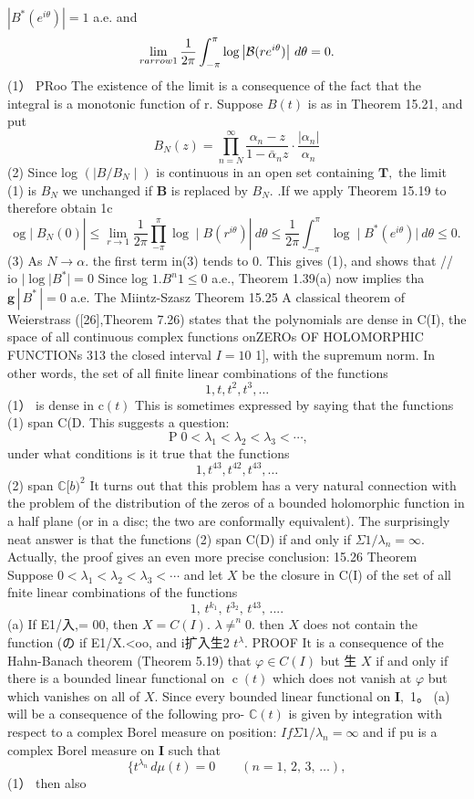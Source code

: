 $\left|B^{*}(e^{i\theta})\right|=1$ a.e. and $$ \operatorname*{lim}_{r arrow1}\frac{1}{2\pi}\int_{-\pi}^{\pi}\log\left|{\cal B}(r e^{i\theta})\right|\,d\theta=0. $$ (1） PRoo The existence of the limit is a consequence of the fact that the integral is a monotonic function of r. Suppose $\scriptstyle B(t)$ is as in Theorem 15.21, and put $$ B_{N}(z)=\prod_{n=N}^{\infty}{\frac{\alpha_{n}-z}{1-\bar{\alpha}_{n}z}}\cdot{\frac{|\alpha_{n}|}{\alpha_{n}}} $$ (2) Since log $(\mid B/B_{N}\mid)$ is continuous in an open set containing ${\boldsymbol{T}},$ the limit (1) is $B_{N}$ we unchanged if $\boldsymbol{B}$ is replaced by $B_{N}.$ .If we apply Theorem 15.19 to therefore obtain 1c $$ \mathrm{og}\mid B_{N}(0)|\leq\operatorname*{lim}_{r\to1}{\frac{1}{2\pi}}\prod_{-\pi}^{\pi}\log\mid B(r^{i\theta})|\ d\theta\leq{\frac{1}{2\pi}}\int_{-\pi}^{\pi}\log\mid B^{*}(e^{i\theta})|\ d\theta\leq0. $$ (3) As $N\to\alpha.$ the first term in(3) tends to 0. This gives (1), and shows that // io $|\log|B^{*}|=0$ Since log $1.B^{n}1\leq0$ a.e., Theorem 1.39(a) now implies tha $\mathbf{g}\,|\,B^{*}\,|=0$ a.e. The Miintz-Szasz Theorem 15.25 A classical theorem of Weierstrass ([26],Theorem 7.26) states that the polynomials are dense in C(I), the space of all continuous complex functions onZEROs OF HOLOMORPHIC FUNCTIONs 313 the closed interval $\scriptstyle I=10$ 1], with the supremum norm. In other words, the set of all finite linear combinations of the functions $$ 1,t,t^{2},t^{3},\ldots $$ (1） is dense in $\mathrm{c}(t)$ This is sometimes expressed by saying that the functions (1) span C(D. This suggests a question: $$ \operatorname{P}0<\lambda_{1}<\lambda_{2}<\lambda_{3}<\cdots, $$ under what conditions is it true that the functions $$ 1,t^{43},t^{42},t^{43},\ldots $$ (2) span $\mathbb{C}[b)^{2}$ It turns out that this problem has a very natural connection with the problem of the distribution of the zeros of a bounded holomorphic function in a half plane (or in a disc; the two are conformally equivalent). The surprisingly neat answer is that the functions (2) span C(D) if and only if $\Sigma1/\lambda_{n}=\infty.$ Actually, the proof gives an even more precise conclusion: 15.26 Theorem Suppose $0<\lambda_{1}<\lambda_{2}<\lambda_{3}<\cdots$ and let $X$ be the closure in C(I) of the set of all fnite linear combinations of the functions $$ 1,\,t^{k_{1}},\,t^{3_{2}},\,t^{43},\,.... $$ (a) If E1/入,= 00, then $X=C(I).$ $\scriptstyle\lambda\neq^{n}0.$ then $X$ does not contain the function (の if E1/X.<oo, and i扩入生{2} $t^{\lambda}.$ PROOF ${\mathrm{It}}$ is a consequence of the Hahn-Banach theorem (Theorem 5.19) that $\varphi\in C(I)$ but 生 $X$ if and only if there is a bounded linear functional on $\operatorname{c}(t)$ which does not vanish at $\varphi$ but which vanishes on all of $X.$ Since every bounded linear functional on ${\boldsymbol{I}},$ 1。 (a) will be a consequence of the following pro- $\mathbb{C}(t)$ is given by integration with respect to a complex Borel measure on position: $I f\Sigma{1}/\lambda_{n}=\infty$ and if pu is a complex Borel measure on ${\mathbf I}$ such that $$ \{t^{\lambda_{n}}\,d\mu(t)=0\qquad(n=1,\,2,\,3,\,\ldots), $$ (1） then also $$ 